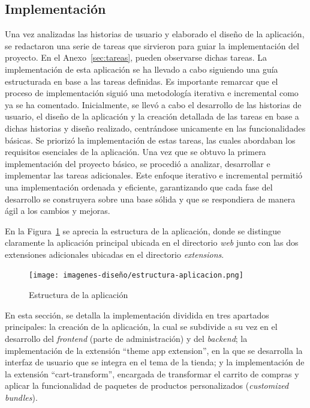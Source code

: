 \documentclass[11pt]{article}
\begin{document}
\subsection{Implementación}
Una vez analizadas las historias de usuario y elaborado el diseño de la aplicación, se redactaron una serie de tareas que sirvieron para guiar 
la implementación del proyecto. En el Anexo~\ref{sec:tareas}, pueden observarse dichas tareas. La implementación de esta aplicación se ha llevado a cabo siguiendo una guía estructurada en base a las tareas definidas. 
Es importante remarcar que el proceso de implementación siguió una metodología iterativa e incremental como ya se ha comentado. Inicialmente, se llevó a cabo el desarrollo
de las historias de usuario, el diseño de la aplicación y la creación detallada de las tareas en base a dichas historias y diseño realizado, centrándose unicamente en las funcionalidades básicas. Se priorizó
la implementación de estas tareas, las cuales abordaban los requisitos esenciales de la aplicación. Una vez que se obtuvo la primera implementación del
proyecto básico, se procedió a analizar, desarrollar e implementar las tareas adicionales. Este enfoque iterativo e incremental permitió una implementación
ordenada y eficiente, garantizando que cada fase del desarrollo se construyera sobre una base sólida y que se respondiera de manera ágil a los cambios y mejoras.

En la Figura~\ref{fig:esquemaAplicacionReal} se aprecia la estructura de la aplicación, donde se distingue claramente
la aplicación principal ubicada en el directorio \textit{web} junto con las dos extensiones adicionales ubicadas en el directorio \textit{extensions}.

\begin{figure}[H]
    \centering
    \texttt{[image: imagenes-diseño/estructura-aplicacion.png]}
    \caption{\label{fig:esquemaAplicacionReal}Estructura de la aplicación}
    \vspace{\fill}
\end{figure}

En esta sección, se detalla la implementación dividida en tres apartados principales: la creación de la aplicación, 
la cual se subdivide a su vez en el desarrollo del \textit{frontend} (parte de administración) y del \textit{backend}; la implementación de la extensión 
``theme app extension'', en la que se desarrolla la interfaz de usuario que se integra en el tema de la tienda; y la implementación de 
la extensión ``cart-transform'', encargada de transformar el carrito de compras y aplicar la funcionalidad de paquetes de productos 
personalizados (\textit{customized bundles}).
\end{document}
